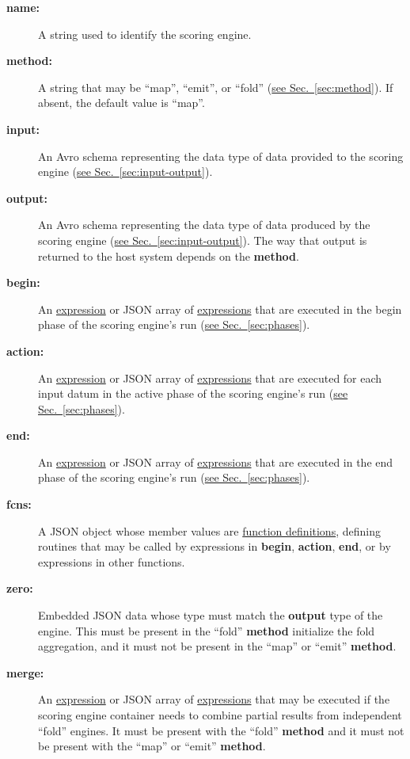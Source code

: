 \documentclass{article}
\newcommand{\PFAc}{\ttfamily\bfseries}
\newenvironment{allowedfields}%
  {\begin{center} \begin{minipage}{0.9\linewidth} \begin{description}}%
  {\end{description} \end{minipage} \end{center}}
\theoremstyle{definition}
\begin{document}
\begin{allowedfields}
\item[\PFAc name:] A string used to identify the scoring engine.
\item[\PFAc method:] A string that may be ``map'', ``emit'', or ``fold'' (\hyperlink{hsec:method}{see Sec.~\ref{sec:method}}).  If absent, the default value is ``map''.
\item[\PFAc input:] An Avro schema representing the data type of data provided to the scoring engine (\hyperlink{hsec:input-output}{see Sec.~\ref{sec:input-output}}).
\item[\PFAc output:] An Avro schema representing the data type of data produced by the scoring engine (\hyperlink{hsec:input-output}{see Sec.~\ref{sec:input-output}}).  The way that output is returned to the host system depends on the {\PFAc method}.
\item[\PFAc begin:] An \hyperlink{hsec:expressions}{expression} or JSON array of \hyperlink{hsec:expressions}{expressions} that are executed in the begin phase of the scoring engine's run (\hyperlink{hsec:phases}{see Sec.~\ref{sec:phases}}).
\item[\PFAc action:] An \hyperlink{hsec:expressions}{expression} or JSON array of \hyperlink{hsec:expressions}{expressions} that are executed for each input datum in the active phase of the scoring engine's run (\hyperlink{hsec:phases}{see Sec.~\ref{sec:phases}}).
\item[\PFAc end:] An \hyperlink{hsec:expressions}{expression} or JSON array of \hyperlink{hsec:expressions}{expressions} that are executed in the end phase of the scoring engine's run (\hyperlink{hsec:phases}{see Sec.~\ref{sec:phases}}).
\item[\PFAc fcns:] A JSON object whose member values are \hyperlink{hsec:fcndef}{function definitions}, defining routines that may be called by expressions in {\PFAc begin}, {\PFAc action}, {\PFAc end}, or by expressions in other functions.
\item[\PFAc zero:] Embedded JSON data whose type must match the {\PFAc output} type of the engine.  This must be present in the ``fold'' {\PFAc method} initialize the fold aggregation, and it must not be present in the ``map'' or ``emit'' {\PFAc method}.
\item[\PFAc merge:] An \hyperlink{hsec:expressions}{expression} or JSON array of \hyperlink{hsec:expressions}{expressions} that may be executed if the scoring engine container needs to combine partial results from independent ``fold'' engines.  It must be present with the ``fold'' {\PFAc method} and it must not be present with the ``map'' or ``emit'' {\PFAc method}.

\end{allowedfields}
\end{document}
